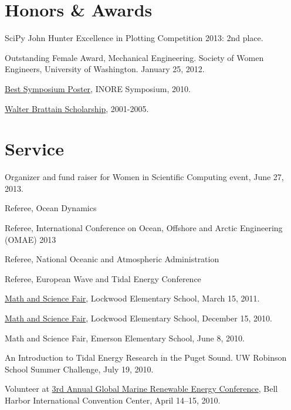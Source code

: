 \documentclass[10pt,letterpaper]{article}
\renewenvironment{itemize}{
  \begin{list}{}{
    \setlength{\leftmargin}{1.5em}
    \setlength{\itemsep}{0.25em}
    \setlength{\parskip}{0pt}
    \setlength{\parsep}{0.25em}
  }
}{
  \end{list}
}
\begin{document}
\section*{Honors \& Awards}

\begin{itemize}

\item SciPy John Hunter Excellence in Plotting Competition 2013: 2nd place.

\item Outstanding Female Award, Mechanical Engineering. Society of Women Engineers, University of Washington. January 25, 2012.

\item \href{http://www.inore.org}{Best Symposium Poster}, INORE Symposium, 2010.

\item \href{https://www.whitman.edu/content/catalog/financial-aid}{Walter Brattain Scholarship}, 2001-2005.

%

\end{itemize}

\section*{Service}
\begin{itemize}
  \item Organizer and fund raiser for Women in Scientific Computing event, June 27, 2013.
  \item Referee, Ocean Dynamics
  \item Referee, International Conference on Ocean, Offshore and Arctic Engineering (OMAE) 2013
	\item Referee, National Oceanic and Atmospheric Administration
	\item Referee, European Wave and Tidal Energy Conference
	\item \href{http://www.amath.washington.edu/~siamuw/math-fair.html}{Math and Science Fair}, Lockwood Elementary School, March 15, 2011.
	\item \href{http://www.amath.washington.edu/~siamuw/math-fair.html}{Math and Science Fair}, Lockwood Elementary School, December 15, 2010.
	\item Math and Science Fair, Emerson Elementary School, June 8, 2010.
	\item An Introduction to Tidal Energy Research in the Puget Sound. UW Robinson School Summer Challenge, July 19, 2010.
	\item Volunteer at \href{http://www.globalmarinerenewable.com/}{3rd Annual Global Marine Renewable Energy Conference},  Bell Harbor International Convention Center,  April 14--15, 2010.
\end{itemize}
\end{document}
